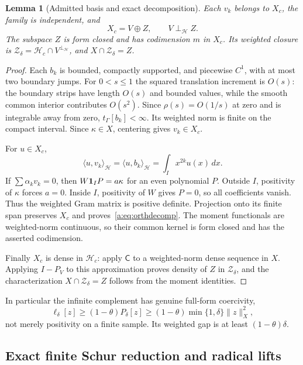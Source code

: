 \documentclass[11pt,a4paper]{article}
\numberwithin{equation}{section}
\newtheorem{lemma}[theorem]{Lemma}
\theoremstyle{definition}\newtheorem{definition}[theorem]{Definition}
\theoremstyle{remark}\newtheorem{remark}[theorem]{Remark}
\newcommand{\Hh}{\mathcal H}\newcommand{\Hw}{\mathcal H}
\newcommand{\tg}{t_\Gamma}\newcommand{\cg}{c_\Gamma}
\newcommand{\ip}[2]{\langle#1,#2\rangle}\newcommand{\norm}[1]{\lVert#1\rVert}\newcommand{\abs}[1]{\lvert#1\rvert}
\newcommand{\Zc}{\mathcal Z_\delta}\newcommand{\Rcal}{\mathcal R}
\begin{document}
\begin{lemma}[Admitted basis and exact decomposition]\label{a:lem:VZ}
Each $v_k$ belongs to $X_c$, the family is independent, and
\begin{equation}\label{a:eq:orthdecomp}
 X_c=V\oplus Z,\qquad V\perp_{\Hh} Z.
\end{equation}
The subspace $Z$ is form closed and has codimension $m$ in $X_c$. Its weighted closure is
$\Zc=\Hh_c\cap V^{\perp_{\Hh}}$, and $X\cap\Zc=Z$.
\end{lemma}
\begin{proof}
Each $b_k$ is bounded, compactly supported, and piecewise $C^1$, with at most two boundary jumps. For $0<s\le1$ the squared translation increment is $O(s)$: the boundary strips have length $O(s)$ and bounded values, while the smooth common interior contributes $O(s^2)$. Since $\rho(s)=O(1/s)$ at zero and is integrable away from zero, $\tg[b_k]<\infty$. Its weighted norm is finite on the compact interval. Since $\kappa\in X$, centering gives $v_k\in X_c$.

For $u\in X_c$,
\[
 \ip u{v_k}_{\Hh}=\ip u{b_k}_{\Hh}
                    =\int_Ix^{2k}u(x)\,dx.
\]
If $\sum\alpha_kv_k=0$, then $W\mathbf1_IP=a\kappa$ for an even polynomial $P$. Outside $I$, positivity of $\kappa$ forces $a=0$. Inside $I$, positivity of $W$ gives $P=0$, so all coefficients vanish. Thus the weighted Gram matrix is positive definite. Projection onto its finite span preserves $X_c$ and proves~\eqref{a:eq:orthdecomp}. The moment functionals are weighted-norm continuous, so their common kernel is form closed and has the asserted codimension.

Finally $X_c$ is dense in $\Hh_c$: apply $\mathsf C$ to a weighted-norm dense sequence in $X$. Applying $I-P_V$ to this approximation proves density of $Z$ in $\Zc$, and the characterization $X\cap\Zc=Z$ follows from the moment identities.
\end{proof}

In particular the infinite complement has genuine full-form coercivity,
\begin{equation}\label{a:eq:Zcoercive}
 \ell_\delta[z]\ge(1-\theta)P_\delta[z]
 \ge(1-\theta)\min\{1,\delta\}\norm z_X^2,
\end{equation}
not merely positivity on a finite sample. Its weighted gap is at least $(1-\theta)\delta$.

\subsection{Exact finite Schur reduction and radical lifts}\label{a:sec:schur}
\end{document}
